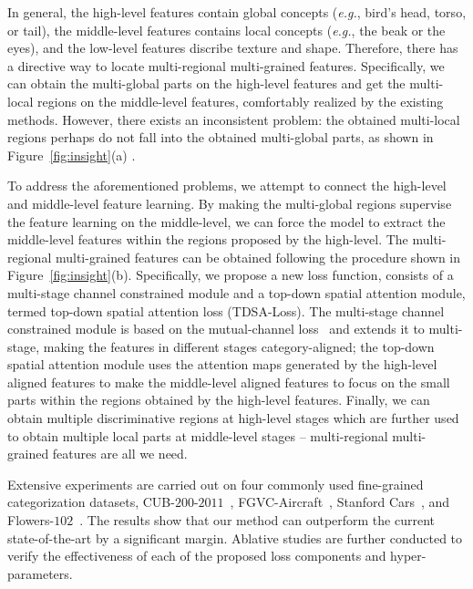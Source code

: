 \documentclass[journal]{IEEEtran}
\begin{document}
In general, the high-level features contain global concepts (\emph{e.g.}, bird's head, torso, or tail), the middle-level features contains local concepts (\emph{e.g.}, the beak or the eyes), and the low-level features discribe texture and shape.  Therefore, there has a directive way to locate multi-regional multi-grained features. Specifically, we can obtain the multi-global parts on the high-level features and get the multi-local regions on the middle-level features, comfortably realized by the existing methods. However, there 
exists an inconsistent problem: the obtained multi-local regions perhaps do not fall into the obtained multi-global parts, as shown in Figure~\ref{fig:insight}(a) . 


To address the aforementioned problems, we attempt to connect the high-level and middle-level feature learning. By making the multi-global regions supervise the feature learning on the middle-level, we can force the model to extract the middle-level features within the regions proposed by the high-level. The multi-regional multi-grained features can be obtained following the procedure shown in Figure~\ref{fig:insight}(b). 
Specifically, we propose a new loss function, consists of a multi-stage channel constrained module and a top-down spatial attention module, termed top-down spatial attention loss (TDSA-Loss). The multi-stage channel constrained module is based on the mutual-channel loss~\cite{chang2020mc} and extends it to multi-stage, 
making the features in different stages category-aligned; the top-down spatial attention module uses the attention maps generated by the high-level aligned features to make the middle-level aligned features to focus on the small parts within the regions obtained by the high-level features. Finally, we can obtain multiple discriminative regions at high-level stages which are further used to obtain multiple local parts at middle-level stages -- multi-regional multi-grained features are all we need.




Extensive experiments are carried out on four commonly used fine-grained categorization datasets, CUB-$200$-$2011$~\cite{wah2011caltech}, FGVC-Aircraft~\cite{maji2013fine}, Stanford Cars~\cite{krause20133d}, and Flowers-$102$~\cite{nilsback2008automated}. The results show that our method can outperform the current state-of-the-art by a significant margin. Ablative studies are further conducted to verify the effectiveness of each of the proposed loss components and hyper-parameters.
\end{document}
